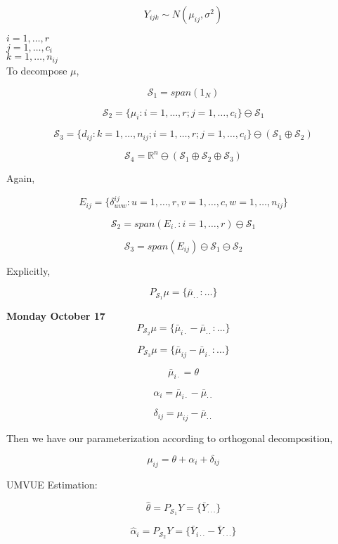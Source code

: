 \documentclass[11pt,fleqn]{book} %
\begin{document}
		$$Y_{ijk} \sim N(\mu_{ij}, \sigma^2) $$

$i = 1, \dots, r$\\
$j = 1, \dots, c_i$\\
$k = 1, \dots, n_{ij}$\\

To decompose $\mu$, 


	$$\mathcal{S}_1 = span(1_N) $$

	$$\mathcal{S}_2 = \{\mu_{i}: i = 1, \dots, r; j = 1, \dots, c_i  \} \ominus \mathcal{S}_1 $$

	$$\mathcal{S}_3 = \{d_{ij}: k = 1, \dots, n_{ij}; i = 1, \dots, r; j = 1, \dots, c_i  \} \ominus (\mathcal{S}_1 \oplus \mathcal{S}_2) $$

	$$\mathcal{S}_4 = \mathbb{R}^n \ominus (\mathcal{S}_1 \oplus \mathcal{S}_2 \oplus \mathcal{S}_3)$$


Again, 

		$$E_{ij} = \{\delta^{ij}_{uvw}: u = 1, \dots, r, v = 1, \dots, c, w = 1, \dots, n_{ij}  \} $$	


		$$\mathcal{S}_2 = span(E_{i\cdot} : i = 1, \dots, r) \ominus \mathcal{S}_1 $$ 

		$$\mathcal{S}_3 = span(E_{i j}) \ominus \mathcal{S}_1 \ominus \mathcal{S}_2 $$ 

Explicitly, 

		$$ P _{\mathcal{S}_1} \mu = \{\bar{\mu}_{\cdot \cdot}: \dots \}$$


\textbf{Monday October 17}\\

		$$ P _{\mathcal{S}_2} \mu = \{\bar{\mu}_{i \cdot} - \bar{\mu}_{\cdot \cdot}: \dots \}$$

		$$ P _{\mathcal{S}_3} \mu = \{\bar{\mu}_{i j} - \bar{\mu}_{i \cdot}: \dots \}$$

		$$ \bar{\mu}_{i \cdot} = \theta $$

		$$ \alpha_i = \bar{\mu}_{i \cdot} - \bar{\mu}_{\cdot \cdot} $$

		$$ \delta_{ij} = \mu_{i j} - \bar{\mu}_{\cdot \cdot} $$

Then we have our parameterization according to orthogonal decomposition, 

		$$ \mu_{ij} = \theta + \alpha_i + \delta_{ij} $$

UMVUE Estimation: 

		$$\hat{\theta} =P _{\mathcal{S}_1} Y =  \{\bar{Y}_{\cdot \cdot \cdot} \} $$


		$$\hat{\alpha}_i =P _{\mathcal{S}_2} Y =  \{\bar{Y}_{i \cdot \cdot} - \bar{Y}_{\cdot \cdot \cdot} \} $$
\end{document}
